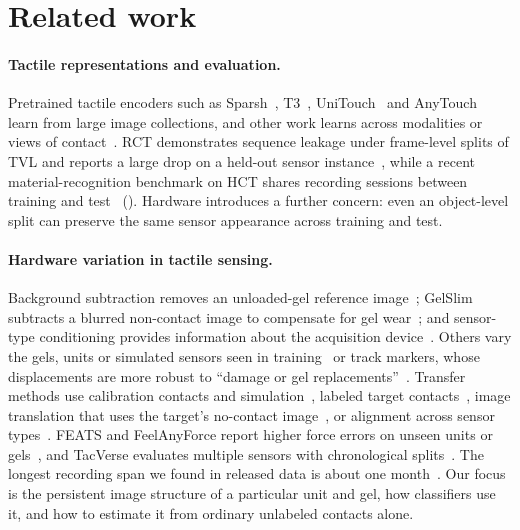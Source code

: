 \section{Related work}
\label{sec:related}

\paragraph{Tactile representations and evaluation.}
Pretrained tactile encoders such as Sparsh~\cite{higuera2024sparsh}, T3~\cite{t3fota2024}, UniTouch~\cite{unitouch2024} and AnyTouch~\cite{anytouch2025,anytouch2026two} learn from large image collections, and other work learns across modalities or views of contact~\cite{tvl2024,tactspace2026}. RCT demonstrates sequence leakage under frame-level splits of TVL and reports a large drop on a held-out sensor instance~\cite{rct2026}, while a recent material-recognition benchmark on HCT shares recording sessions between training and test~\cite{mohsan2026language} (). Hardware introduces a further concern: even an object-level split can preserve the same sensor appearance across training and test.

\paragraph{Hardware variation in tactile sensing.}
Background subtraction removes an unloaded-gel reference image~\cite{higuera2024sparsh,sitr2025,anytouch2026two,htt2026,tactic2026}; GelSlim subtracts a blurred non-contact image to compensate for gel wear~\cite{gelslim2018}; and sensor-type conditioning provides information about the acquisition device~\cite{unitouch2024}. Others vary the gels, units or simulated sensors seen in training~\cite{suresh2024neuralfeels,tactic2026,sitr2025} or track markers, whose displacements are more robust to ``damage or gel replacements''~\cite{rdp2025}. Transfer methods use calibration contacts and simulation~\cite{sitr2025}, labeled target contacts~\cite{bideta2026}, image translation that uses the target's no-contact image~\cite{genforce2026,castano2026forcemap,split2026}, or alignment across sensor types~\cite{cttp2024,htt2026}. FEATS and FeelAnyForce report higher force errors on unseen units or gels~\cite{feats2025,feelanyforce2024}, and TacVerse evaluates multiple sensors with chronological splits~\cite{tacverse2026}. The longest recording span we found in released data is about one month~\cite{tvl2024}. Our focus is the persistent image structure of a particular unit and gel, how classifiers use it, and how to estimate it from ordinary unlabeled contacts alone.

